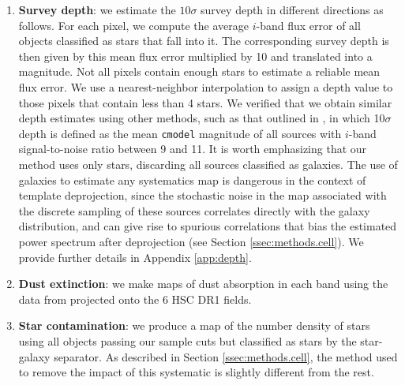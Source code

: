 \documentclass[a4paper,11pt]{article}
\begin{document}
    \begin{enumerate}
      \item {\bf Survey depth}: we estimate the $10\sigma$ survey depth in different directions as follows. For each pixel, we compute the average $i$-band flux error of all objects classified as stars that fall into it. The corresponding survey depth is then given by this mean flux error multiplied by 10 and translated into a magnitude. Not all pixels contain enough stars to estimate a reliable mean flux error. We use a nearest-neighbor interpolation to assign a depth value to those pixels that contain less than 4 stars. We verified that we obtain similar depth estimates using other methods, such as that outlined in \cite{2018PASJ...70S..25M}, in which 10$\sigma$ depth is defined as the mean {\tt cmodel} magnitude of all sources with $i$-band signal-to-noise ratio between 9 and 11. It is worth emphasizing that our method uses only stars, discarding all sources classified as galaxies. The use of galaxies to estimate any systematics map is dangerous in the context of template deprojection, since the stochastic noise in the map associated with the discrete sampling of these sources correlates directly with the galaxy distribution, and can give rise to spurious correlations that bias the estimated power spectrum after deprojection (see Section \ref{ssec:methods.cell}). We provide further details in Appendix \ref{app:depth}.
      \item {\bf Dust extinction}: we make maps of dust absorption in each band using the data from \cite{1998ApJ...500..525S} projected onto the 6 HSC DR1 fields.
      \item {\bf Star contamination}: we produce a map of the number density of stars using all objects passing our sample cuts but classified as stars by the star-galaxy separator. As described in Section \ref{ssec:methods.cell}, the method used to remove the impact of this systematic is slightly different from the rest.

\end{enumerate}
\end{document}
